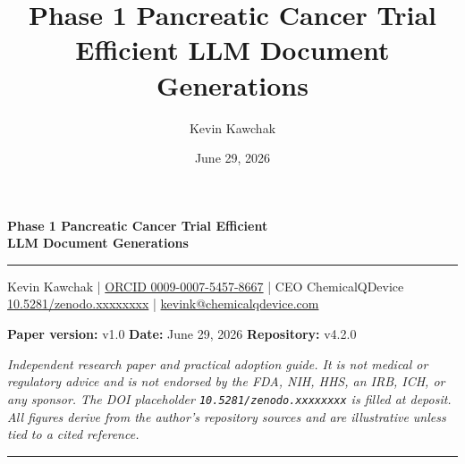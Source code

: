 \documentclass[11pt]{article}
\title{Phase 1 Pancreatic Cancer Trial Efficient LLM Document Generations}
\author{Kevin Kawchak}
\date{June 29, 2026}
\begin{document}
\thispagestyle{plain}

\begin{center}
{\LARGE\bfseries Phase 1 Pancreatic Cancer Trial Efficient\\LLM Document Generations}\\[0.5em]
{\color{paperblack}\rule{\linewidth}{1.2pt}}
\end{center}

\begin{center}\small
Kevin Kawchak \;|\; \href{https://orcid.org/0009-0007-5457-8667}{ORCID 0009-0007-5457-8667} \;|\;
CEO ChemicalQDevice \\
\href{https://doi.org/10.5281/zenodo.xxxxxxxx}{10.5281/zenodo.xxxxxxxx} \;|\;
\href{mailto:kevink@chemicalqdevice.com}{kevink@chemicalqdevice.com}
\end{center}

\begin{center}\footnotesize
\textbf{Paper version:} v1.0 \quad
\textbf{Date:} June 29, 2026 \quad
\textbf{Repository:} v4.2.0
\end{center}

\noindent\footnotesize\textit{Independent research paper and practical adoption
guide. It is not medical or regulatory advice and is not endorsed by the FDA, NIH,
HHS, an IRB, ICH, or any sponsor. The DOI placeholder
\texttt{10.5281/zenodo.xxxxxxxx} is filled at deposit. All figures derive from the
author's repository sources and are illustrative unless tied to a cited
reference.}\normalsize\par

\vspace{0.4em}
{\color{paperblack}\rule{\linewidth}{0.6pt}}



\clearpage

\renewcommand{\contentsname}{Table of Contents}
{\setlength{\parskip}{0pt}\small\tableofcontents}
\clearpage

\clearpage
\clearpage
\clearpage
\clearpage
\clearpage

\end{document}

